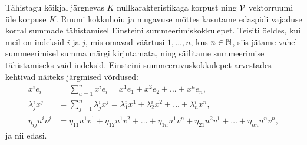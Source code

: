 \bigskip

Tähistagu kõikjal järgnevas $K$ nullkarakteristikaga korpust ning $\mathcal{V}$
vektorruumi üle korpuse $K$. Ruumi kokkuhoiu ja mugavuse mõttes
kasutame edaspidi vajaduse korral summade tähistamisel
Einsteini summeerimiskokkulepet. Teisiti öeldes, kui meil on indeksid
$i$ ja $j$, mis omavad väärtusi $1, \dots, n$, kus $n \in \mathbb{N}$, siis jätame
vahel summeerimisel summa märgi kirjutamata, ning säilitame summeerimise
tähistamiseks vaid indeksid. Einsteini summeeruvuskokkulepet arvestades
kehtivad näiteks järgmised võrdused:
\begin{align*}
    x^{i} e_{i} &= \sum_{a=1}^{n} x^{i} e_{i} = 
        x^{1} e_{1} + x^{2} e_{2} + \dots + x^{n} e_{n}, \\
    \lambda{^i_j} x^{j} &= \sum_{j=1}^{n} 
        \lambda{^i_j} x^{j} = \lambda{^i_1} x^{1} + 
        \lambda{^i_2} x^{2} + 
        \dots +\lambda{^i_n} x^{n},\\
    \eta_{ij} u^{i} v^{j} &= \eta_{11} u^{1} v^{1} + 
        \eta_{12} u^{1} v^{2} + \dots + \eta_{1n} u^{1} v^{n} + 
        \eta_{21} u^{2} v^{1} + \dots + \eta_{nn} u^{n} v^{n},
\end{align*}
ja nii edasi.
